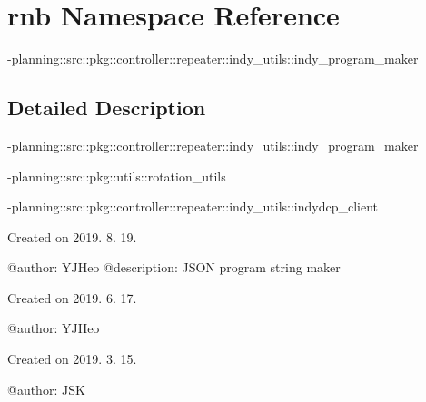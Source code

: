 \hypertarget{namespacernb}{}\section{rnb Namespace Reference}
\label{namespacernb}


-\/planning\+::src\+::pkg\+::controller\+::repeater\+::indy\+\_\+utils\+::indy\+\_\+program\+\_\+maker  




\subsection{Detailed Description}
-\/planning\+::src\+::pkg\+::controller\+::repeater\+::indy\+\_\+utils\+::indy\+\_\+program\+\_\+maker 

-\/planning\+::src\+::pkg\+::utils\+::rotation\+\_\+utils

-\/planning\+::src\+::pkg\+::controller\+::repeater\+::indy\+\_\+utils\+::indydcp\+\_\+client

\begin{DoxyVerb}Created on 2019. 8. 19.

@author: YJHeo
@description: JSON program string maker
\end{DoxyVerb}


\begin{DoxyVerb}Created on 2019. 6. 17.

@author: YJHeo
\end{DoxyVerb}


\begin{DoxyVerb}Created on 2019. 3. 15.

@author: JSK
\end{DoxyVerb}
 